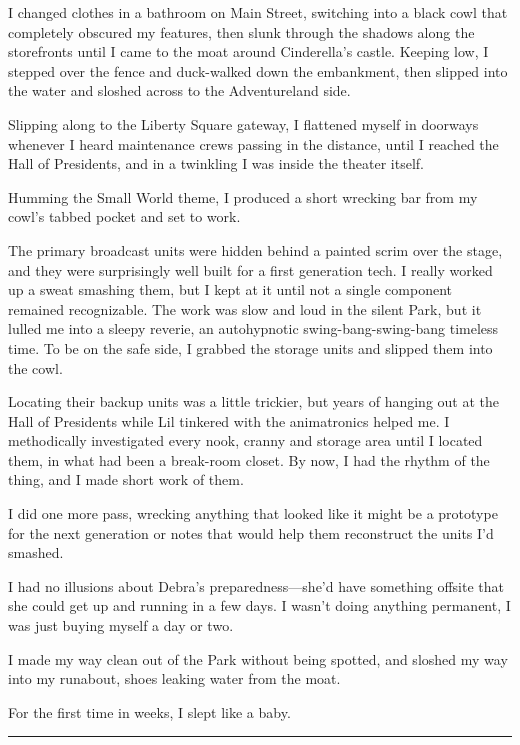 I changed clothes in a bathroom on Main Street, switching into a
black cowl that completely obscured my features, then slunk through
the shadows along the storefronts until I came to the moat around
Cinderella's castle. Keeping low, I stepped over the fence and
duck-walked down the embankment, then slipped into the water and
sloshed across to the Adventureland side.

Slipping along to the Liberty Square gateway, I flattened myself in
doorways whenever I heard maintenance crews passing in the
distance, until I reached the Hall of Presidents, and in a
twinkling I was inside the theater itself.

Humming the Small World theme, I produced a short wrecking bar from
my cowl's tabbed pocket and set to work.

The primary broadcast units were hidden behind a painted scrim over
the stage, and they were surprisingly well built for a first
generation tech. I really worked up a sweat smashing them, but I
kept at it until not a single component remained recognizable. The
work was slow and loud in the silent Park, but it lulled me into a
sleepy reverie, an autohypnotic swing-bang-swing-bang timeless
time. To be on the safe side, I grabbed the storage units and
slipped them into the cowl.

Locating their backup units was a little trickier, but years of
hanging out at the Hall of Presidents while Lil tinkered with the
animatronics helped me. I methodically investigated every nook,
cranny and storage area until I located them, in what had been a
break-room closet. By now, I had the rhythm of the thing, and I
made short work of them.

I did one more pass, wrecking anything that looked like it might be
a prototype for the next generation or notes that would help them
reconstruct the units I'd smashed.

I had no illusions about Debra's preparedness—she'd have something
offsite that she could get up and running in a few days. I wasn't
doing anything permanent, I was just buying myself a day or two.

I made my way clean out of the Park without being spotted, and
sloshed my way into my runabout, shoes leaking water from the
moat.

For the first time in weeks, I slept like a baby.

\begin{center}\rule{3in}{0.4pt}\end{center}

